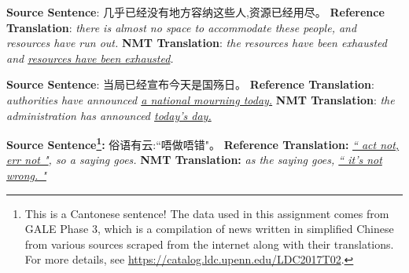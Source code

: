 \begin{parts}
\begin{subparts}
        \subpart[2]
        \textbf{Source Sentence}: 几乎已经没有地方容纳这些人,资源已经用尽。\newline
        \textbf{Reference Translation}: \textit{there is almost no space to accommodate these people, and resources have run out.   }\newline
        \textbf{NMT Translation}: \textit{the resources have been exhausted and \underline{resources have been exhausted}.}
        
        \ifans{}

        \subpart[2]
        \textbf{Source Sentence}: 当局已经宣布今天是国殇日。 \newline
        \textbf{Reference Translation}: \textit{authorities have announced \underline{a national mourning today.}}\newline
        \textbf{NMT Translation}: \textit{the administration has announced \underline{today's day.}}
        
        \ifans{}
        
        \subpart[2] 
        \textbf{Source Sentence\footnote{This is a Cantonese sentence! The data used in this assignment comes from GALE Phase 3, which is a compilation of news written in simplified Chinese from various sources scraped from the internet along with their translations. For more details, see \url{https://catalog.ldc.upenn.edu/LDC2017T02}. }:} 俗语有云:``唔做唔错"。\newline
        \textbf{Reference Translation:} \textit{\underline{`` act not, err not "}, so a saying goes.}\newline
        \textbf{NMT Translation:} \textit{as the saying goes, \underline{`` it's not wrong. "}}
        
        \ifans{}
    \end{subparts}



\end{parts}
